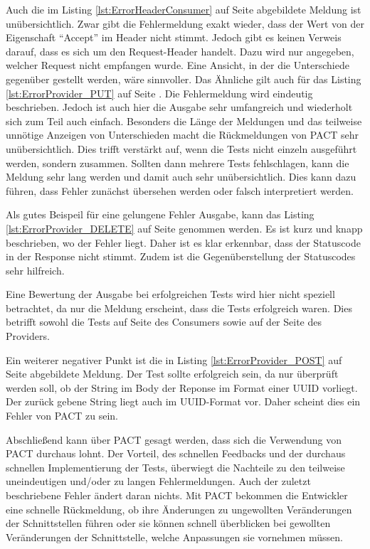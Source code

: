 \documentclass{llncs}
\begin{document}
Auch die im Listing \ref{lst:ErrorHeaderConsumer} auf Seite \pageref{lst:ErrorHeaderConsumer} abgebildete Meldung ist unübersichtlich. Zwar gibt die Fehlermeldung exakt wieder, dass der Wert von der Eigenschaft \enquote{Accept} im Header nicht stimmt. Jedoch gibt es keinen Verweis darauf, dass es sich um den Request-Header handelt. Dazu wird nur angegeben, welcher Request nicht empfangen wurde. Eine Ansicht, in der die Unterschiede gegenüber gestellt werden, wäre sinnvoller.
Das Ähnliche gilt auch für das Listing \ref{lst:ErrorProvider_PUT} auf Seite \pageref{lst:ErrorProvider_PUT}. Die Fehlermeldung wird eindeutig beschrieben. Jedoch ist auch hier die Ausgabe sehr umfangreich und wiederholt sich zum Teil auch einfach. Besonders die Länge der Meldungen und das teilweise unnötige Anzeigen von Unterschieden macht die Rückmeldungen von PACT sehr unübersichtlich. Dies trifft verstärkt auf, wenn die Tests nicht einzeln ausgeführt werden, sondern zusammen. Sollten dann mehrere Tests fehlschlagen, kann die Meldung sehr lang werden und damit auch sehr unübersichtlich. Dies kann dazu führen, dass Fehler zunächst übersehen werden oder falsch interpretiert werden.

Als gutes Beispeil für eine gelungene Fehler Ausgabe, kann das Listing \ref{lst:ErrorProvider_DELETE} auf Seite \pageref{lst:ErrorProvider_DELETE} genommen werden. Es ist kurz und knapp beschrieben, wo der Fehler liegt. Daher ist es klar erkennbar, dass der Statuscode in der Response nicht stimmt. Zudem ist die Gegenüberstellung der Statuscodes sehr hilfreich.

Eine Bewertung der Ausgabe bei erfolgreichen Tests wird hier nicht speziell betrachtet, da nur die Meldung erscheint, dass die Tests erfolgreich waren. Dies betrifft sowohl die Tests auf Seite des Consumers sowie auf der Seite des Providers.

Ein weiterer negativer Punkt ist die in Listing \ref{lst:ErrorProvider_POST} auf Seite \pageref{lst:ErrorProvider_POST} abgebildete Meldung. Der Test sollte erfolgreich sein, da nur überprüft werden soll, ob der String im Body der Reponse im Format einer UUID vorliegt. Der zurück gebene String liegt auch im UUID-Format vor. Daher scheint dies ein Fehler von PACT zu sein. 

Abschließend kann über PACT gesagt werden, dass sich die Verwendung von PACT durchaus lohnt. Der Vorteil, des schnellen Feedbacks und der durchaus schnellen Implementierung der Tests, überwiegt die Nachteile zu den teilweise uneindeutigen und/oder zu langen Fehlermeldungen. Auch der zuletzt beschriebene Fehler ändert daran nichts. Mit PACT bekommen die Entwickler eine schnelle Rückmeldung, ob ihre Änderungen zu ungewollten Veränderungen der Schnittstellen führen oder sie können schnell überblicken bei gewollten Veränderungen der Schnittstelle, welche Anpassungen sie vornehmen müssen.
\end{document}
